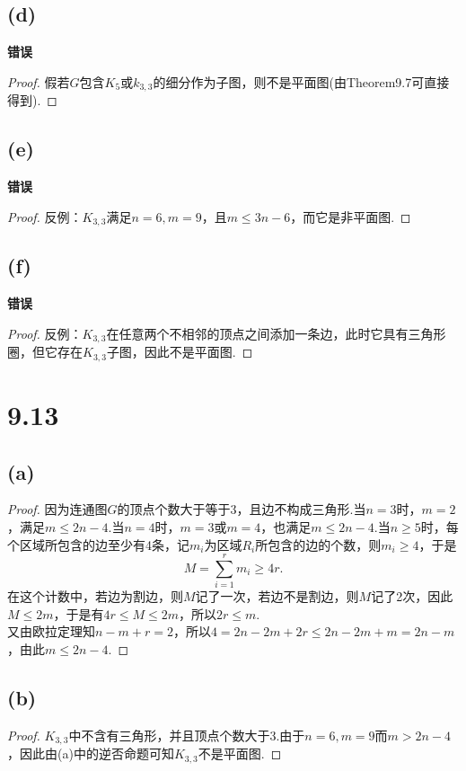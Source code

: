\documentclass[twocolumn]{article}
\newenvironment{SChinese}{%
	\CJKfamily{gbsn}%
	\CJKtilde
	\CJKnospace}{}
\begin{document}
\begin{CJK}{UTF8}{}
\begin{SChinese}
				\subsection*{(d)}
					\textbf{错误}
					\begin{proof}
						假若$G$包含$K_5$或$k_{3,3}$的细分作为子图，则不是平面图(由Theorem9.7可直接得到).
					\end{proof}
				\subsection*{(e)}
					\textbf{错误}
					\begin{proof}
						反例：$K_{3,3}$满足$n=6,m=9$，且$m\le 3n-6$，而它是非平面图.
					\end{proof}
				\subsection*{(f)}
					\textbf{错误}
					\begin{proof}
						反例：$K_{3,3}$在任意两个不相邻的顶点之间添加一条边，此时它具有三角形圈，但它存在$K_{3,3}$子图，因此不是平面图.
					\end{proof}
			\section*{9.13}
				\subsection*{(a)}
					\begin{proof}
						因为连通图$G$的顶点个数大于等于3，且边不构成三角形.当$n=3$时，$m=2$，满足$m\le 2n-4$.当$n=4$时，$m=3$或$m=4$，也满足$m\le 2n-4$.当$n\ge5$时，每个区域所包含的边至少有4条，记$m_i$为区域$R_i$所包含的边的个数，则$m_i\ge4$，于是\begin{displaymath}
							M=\sum_{i=1}^{r}m_i\ge4r.
						\end{displaymath}
						在这个计数中，若边为割边，则$M$记了一次，若边不是割边，则$M$记了2次，因此$M\le2m$，于是有$4r\le M\le 2m$，所以$2r\le m$.\\
						又由欧拉定理知$n-m+r=2$，所以$4=2n-2m+2r\le 2n-2m+m=2n-m$，由此$m\le2n-4$.
					\end{proof}
				\subsection*{(b)}
					\begin{proof}
						$K_{3,3}$中不含有三角形，并且顶点个数大于3.由于$n=6,m=9$而$m>2n-4$，因此由(a)中的逆否命题可知$K_{3,3}$不是平面图.
					\end{proof}

\end{SChinese}
\end{CJK}
\end{document}
